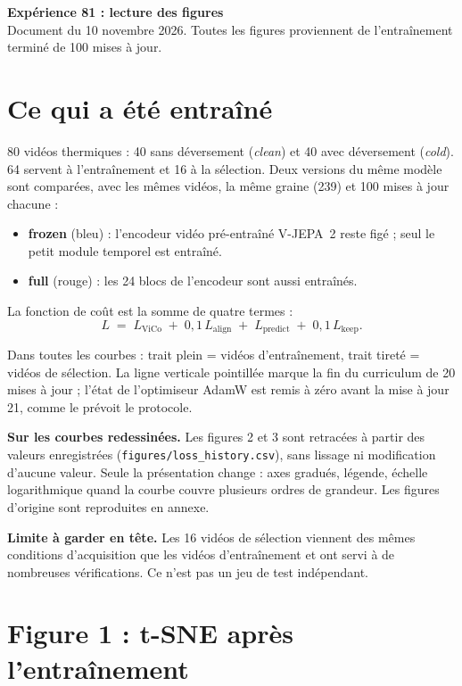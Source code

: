 \documentclass[11pt,a4paper]{article}
\begin{document}
{\LARGE\bfseries Expérience 81 : lecture des figures}\\[2pt]
{\small Document du 10 novembre 2026. Toutes les figures proviennent de l'entraînement terminé de 100 mises à jour.}

\section*{Ce qui a été entraîné}

80 vidéos thermiques : 40 sans déversement (\emph{clean}) et 40 avec déversement (\emph{cold}).
64 servent à l'entraînement et 16 à la sélection. Deux versions du même modèle sont comparées,
avec les mêmes vidéos, la même graine (239) et 100 mises à jour chacune :

\begin{itemize}\itemsep1pt
\item \textcolor{frozen}{\textbf{frozen} (bleu)} : l'encodeur vidéo pré-entraîné V-JEPA~2 reste figé ; seul le petit module temporel est entraîné.
\item \textcolor{full}{\textbf{full} (rouge)} : les 24 blocs de l'encodeur sont aussi entraînés.
\end{itemize}

La fonction de coût est la somme de quatre termes :
\[
L \;=\; L_{\text{ViCo}} \;+\; 0{,}1\,L_{\text{align}} \;+\; L_{\text{predict}} \;+\; 0{,}1\,L_{\text{keep}} .
\]

Dans toutes les courbes : trait plein = vidéos d'entraînement, trait tireté = vidéos de sélection.
La ligne verticale pointillée marque la fin du curriculum de 20 mises à jour ; l'état de
l'optimiseur AdamW est remis à zéro avant la mise à jour 21, comme le prévoit le protocole.

\textbf{Sur les courbes redessinées.} Les figures 2 et 3 sont retracées à partir des valeurs
enregistrées (\texttt{figures/loss\_history.csv}), sans lissage ni modification d'aucune valeur.
Seule la présentation change : axes gradués, légende, échelle logarithmique quand la courbe
couvre plusieurs ordres de grandeur. Les figures d'origine sont reproduites en annexe.

\textbf{Limite à garder en tête.} Les 16 vidéos de sélection viennent des mêmes conditions
d'acquisition que les vidéos d'entraînement et ont servi à de nombreuses vérifications. Ce n'est
pas un jeu de test indépendant.

\newpage
\section*{Figure 1 : t-SNE après l'entraînement}
\end{document}
